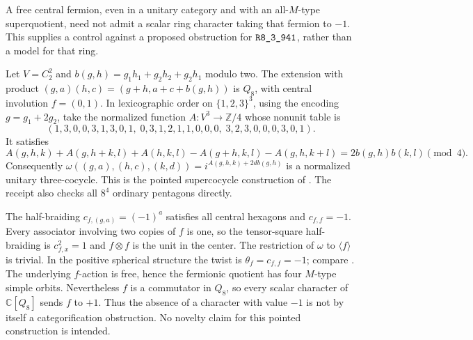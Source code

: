\begin{example}
\label{ex:frontier-fermion-no-negative-character}
A free central fermion, even in a unitary category and with an all-$M$-type
superquotient, need not admit a scalar ring character taking that fermion
to $-1$.  This supplies a control against a proposed obstruction for
$\sha{R8_3_941}$, rather than a model for that ring.

Let $V=C_2^2$ and
$b(g,h)=g_1h_1+g_2h_2+g_2h_1$ modulo two.  The extension with product
$(g,a)(h,c)=(g+h,a+c+b(g,h))$ is $Q_8$, with central involution
$f=(0,1)$.  In lexicographic order on $\{1,2,3\}^3$, using the encoding
$g=g_1+2g_2$, take the normalized function $A:V^3\to\mathbb Z/4$
whose nonunit table is
\[
 (1,3,0,0,3,1,3,0,1,\;0,3,1,2,1,1,0,0,0,\;3,2,3,0,0,0,3,0,1).
\]
It satisfies
\[
 A(g,h,k)+A(g,h+k,l)+A(h,k,l)
 -A(g+h,k,l)-A(g,h,k+l)=2b(g,h)b(k,l)\pmod4.
\]
Consequently
$\omega((g,a),(h,c),(k,d))=i^{A(g,h,k)+2d b(g,h)}$
is a normalized unitary three-cocycle.  This is the pointed supercocycle
construction of \cite[Theorem~5.4 and Corollary~5.8]{UsherFermionic}.
The receipt also checks all $8^4$ ordinary pentagons directly.

The half-braiding $c_{f,(g,a)}=(-1)^a$ satisfies all central hexagons and
$c_{f,f}=-1$.  Every associator involving two copies of $f$ is one,
so the tensor-square half-braiding is $c_{f,x}^2=1$ and $f\otimes f$
is the unit in the center.  The restriction of $\omega$ to
$\langle f\rangle$ is trivial.  In the positive spherical structure the
twist is $\theta_f=c_{f,f}=-1$; compare
\cite[Section~2.11.5, equation~(26)]{DGNO}.
The underlying $f$-action is free, hence the fermionic quotient has four
$M$-type simple orbits.  Nevertheless $f$ is a commutator in $Q_8$, so
every scalar character of $\mathbb C[Q_8]$ sends $f$ to $+1$.
Thus the absence of a character with value $-1$ is not by itself a
categorification obstruction.  No novelty claim for this pointed
construction is intended.
\end{example}


